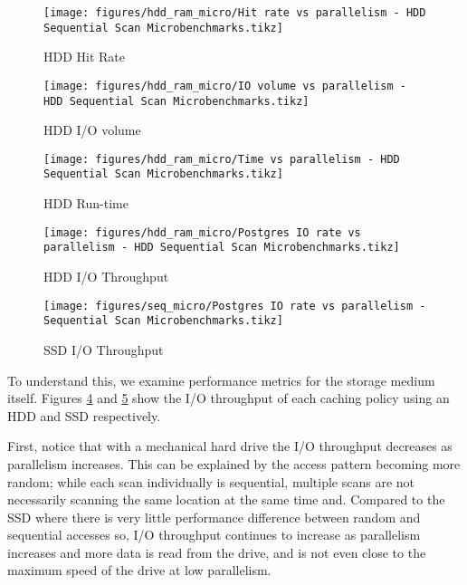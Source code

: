\begin{figure*}
    \begin{subfigure}{\textwidth}
        \centering
        \texttt{[image: figures/hdd\_ram\_micro/Hit rate vs parallelism - HDD Sequential Scan Microbenchmarks.tikz]}
        \caption{HDD Hit Rate}
        \label{fig:hdd_hitrate}
    \end{subfigure}
    \begin{subfigure}{\textwidth}
       \centering
        \texttt{[image: figures/hdd\_ram\_micro/IO volume vs parallelism - HDD Sequential Scan Microbenchmarks.tikz]}
        \caption{HDD I/O volume}
        \label{fig:hdd_iovol}
    \end{subfigure}
    \begin{subfigure}{\textwidth}
        \centering
        \texttt{[image: figures/hdd\_ram\_micro/Time vs parallelism - HDD Sequential Scan Microbenchmarks.tikz]}
        \caption{HDD Run-time}
        \label{fig:hdd_time}
    \end{subfigure}
    \caption{HDD Results}
    \label{fig:hdd_results}
\end{figure*}

\begin{figure*}
    \begin{subfigure}{\textwidth}
        \centering
        \texttt{[image: figures/hdd\_ram\_micro/Postgres IO rate vs parallelism - HDD Sequential Scan Microbenchmarks.tikz]}
        \caption{HDD I/O Throughput}
        \label{fig:hdd_iorate}
    \end{subfigure}  \hspace{0.16\textwidth}
    \begin{subfigure}{\textwidth}
        \centering
        \texttt{[image: figures/seq\_micro/Postgres IO rate vs parallelism - Sequential Scan Microbenchmarks.tikz]}
        \caption{SSD I/O Throughput}
        \label{fig:ssd_iorate}
    \end{subfigure}
    \caption{HDD vs SSD I/O Throughput}
\end{figure*}

To understand this, we examine performance metrics for the storage medium itself. Figures \ref{fig:hdd_iorate} and \ref{fig:ssd_iorate} show the I/O throughput of each caching policy using an HDD and SSD respectively.

First, notice that with a mechanical hard drive the I/O throughput decreases as parallelism increases. This can be explained by the access pattern becoming more random; while each scan individually is sequential, multiple scans are not necessarily scanning the same location at the same time and. Compared to the SSD where there is very little performance difference between random and sequential accesses so, I/O throughput continues to increase as parallelism increases and more data is read from the drive, and is not even close to the maximum speed of the drive at low parallelism. 

